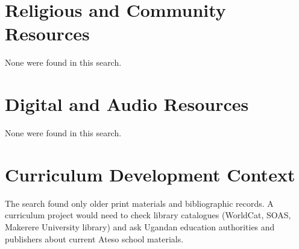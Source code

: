 \documentclass[12pt]{article}
\begin{document}
\section{Religious and Community Resources}
None were found in this search.

\section{Digital and Audio Resources}
None were found in this search.

\section{Curriculum Development Context}
The search found only older print materials and bibliographic records. A curriculum project would need to check library catalogues (WorldCat, SOAS, Makerere University library) and ask Ugandan education authorities and publishers about current Ateso school materials.
\end{document}
